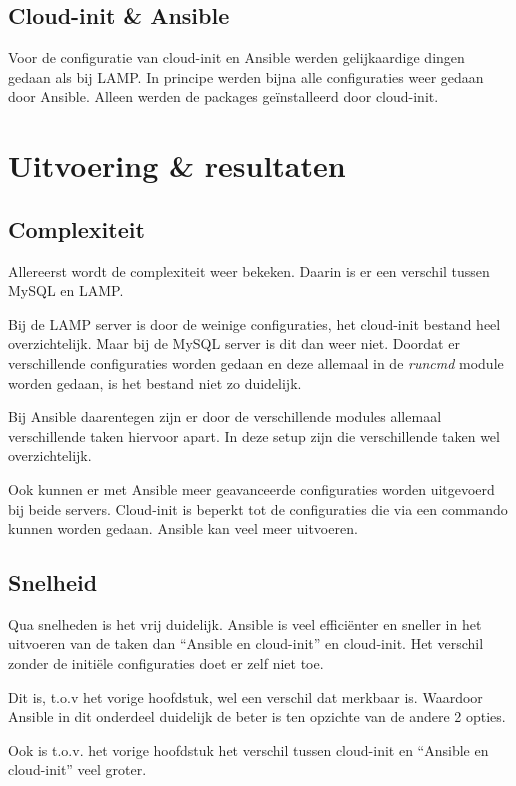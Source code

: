 \subsection{Cloud-init \& Ansible}
Voor de configuratie van cloud-init en Ansible werden gelijkaardige dingen gedaan als bij LAMP. In principe werden bijna alle configuraties weer gedaan door Ansible. Alleen werden de packages geïnstalleerd door cloud-init.

\section{Uitvoering \& resultaten}
\subsection{Complexiteit}
Allereerst wordt de complexiteit weer bekeken. Daarin is er een verschil tussen MySQL en LAMP.

Bij de LAMP server is door de weinige configuraties, het cloud-init bestand heel overzichtelijk. Maar bij de MySQL server is dit dan weer niet. Doordat er verschillende configuraties worden gedaan en deze allemaal in de \textit{runcmd} module worden gedaan, is het bestand niet zo duidelijk. 

Bij Ansible daarentegen zijn er door de verschillende modules allemaal verschillende taken hiervoor apart. In deze setup zijn die verschillende taken wel overzichtelijk. 

Ook kunnen er met Ansible meer geavanceerde configuraties worden uitgevoerd bij beide servers. Cloud-init is beperkt tot de configuraties die via een commando kunnen worden gedaan. Ansible kan veel meer uitvoeren. 


\subsection{Snelheid}
Qua snelheden is het vrij duidelijk. Ansible is veel efficiënter en sneller in het uitvoeren van de taken dan ``Ansible en cloud-init'' en cloud-init. Het verschil zonder de initiële configuraties doet er zelf niet toe. 

Dit is, t.o.v het vorige hoofdstuk, wel een verschil dat merkbaar is. Waardoor Ansible in dit onderdeel duidelijk de beter is ten opzichte van de andere 2 opties.

Ook is t.o.v. het vorige hoofdstuk het verschil tussen cloud-init en ``Ansible en cloud-init'' veel groter.

